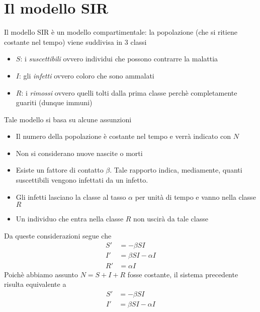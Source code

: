 


\section{Il modello SIR}
Il modello SIR \`e un modello compartimentale: la popolazione (che si ritiene costante nel tempo) viene suddivisa in $3$ classi
\begin{itemize}
	\item $S$: i\textit{ suscettibili}  ovvero individui che possono contrarre la malattia
	\item $I$: gli \textit{ infetti} ovvero coloro che sono ammalati
	\item $R$: i \textit{ rimossi } ovvero quelli tolti dalla prima classe perch\`e completamente guariti (dunque immuni) 
	\end{itemize}
	Tale modello si basa su alcune assunzioni 
	\begin{itemize}
		\item Il numero della popolazione \`e costante nel tempo e verr\`a indicato con $N$ 
		\item Non si considerano nuove nascite o morti 

		\item Esiste un fattore di contatto  $\beta$. Tale rapporto indica, mediamente,  quanti suscettibili vengono infettati da un infetto.
		\item Gli infetti lasciano la classe al tasso $\alpha$ per unit\`a di tempo e vanno nella classe $R$
		\item Un individuo che entra nella classe $R$ non uscir\`a da tale classe
	\end{itemize}
Da queste considerazioni segue che 
\begin{equation}
\label{SIR}
\begin{aligned}
  S'&=-\beta S I \\
  I'&= \beta S I -\alpha I\\
  R'&=\alpha I 
\end{aligned}
\end{equation}
Poich\`e abbiamo assunto $N=S+I+R$ fosse costante, il sistema precedente risulta equivalente a 
\begin{equation}
\label{SI}
\begin{aligned}
  S'&=-\beta S I \\
  I'&= \beta S I -\alpha I
\end{aligned}
\end{equation}\\ 
